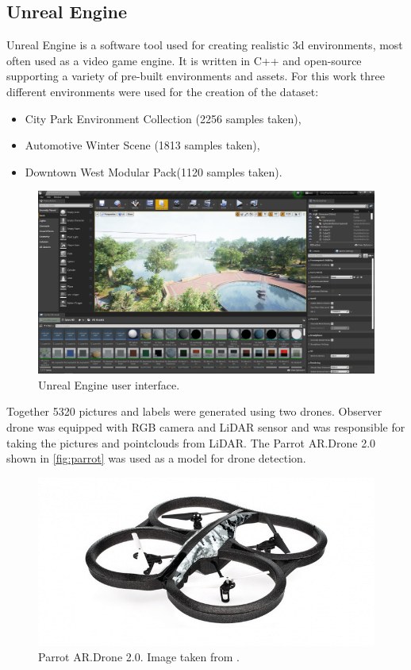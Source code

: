 \documentclass[twoside]{ctuthesis}
\theoremstyle{plain}
\theoremstyle{definition}
\theoremstyle{note}
\begin{document}
\subsection{Unreal Engine}
Unreal Engine is a software tool used for creating realistic 3d environments, most often used as a video game engine. It is written in C++ and open-source supporting a variety of pre-built environments and assets. For this work three different environments were used for the creation of the dataset:
\begin{itemize}
	\item City Park Environment Collection (2256 samples taken),
	\item Automotive Winter Scene (1813 samples taken),
	\item Downtown West Modular Pack(1120 samples taken).
\end{itemize}
\begin{figure}
	\centering
	\includegraphics[width=\textwidth]{unreal_ui.png}
	\caption{Unreal Engine user interface.}
\end{figure}
Together 5320 pictures and labels were generated using two drones. Observer drone was equipped with RGB camera and LiDAR sensor and was responsible for taking the pictures and pointclouds from LiDAR. The Parrot AR.Drone 2.0 shown in \autoref{fig:parrot} was used as a model for drone detection.
\begin{figure}
	\centering
	\includegraphics[width=\textwidth]{parrot.png}
	\caption{Parrot AR.Drone 2.0. Image taken from \cite{parrot}.}
	\label{fig:parrot}
\end{figure}
\end{document}
